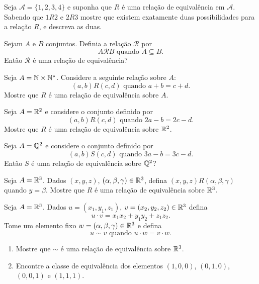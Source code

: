 \documentclass[12pt]{exam}
\begin{document}
    \vspace{.3cm}

    \questao{} Seja $\mathcal{A} = \{1,2,3,4\}$ e suponha que $R$ é uma relação de equivalência em $\mathcal{A}$. Sabendo que $1R2$ e $2R3$ mostre que existem exatamente duas possibilidades para a relação $R$, e descreva as duas.

    \vspace{.3cm}

    \questao{} Sejam $A$ e $B$ conjuntos. Definia a relação $\mathcal{R}$ por
    \[
        A \mathcal{R} B \mbox{ quando } A \subseteq B.
    \]
    Então $\mathcal{R}$ é uma relação de equivalência?

    \vspace{.3cm}

    \questao{} Seja $A = \mathbb{N} \times \mathbb{N}^*$. Considere a seguinte
    relação sobre $A$:
    \[
        (a,b) R (c,d) \mbox{ quando } a + b = c + d.
    \]
    Mostre que $R$ é uma relação de equivalência sobre $A$.

    \vspace{.3cm}

    \questao{} Seja $A = \mathbb{R}^2$ e considere o conjunto definido por
    \[
      (a,b)R(c,d) \mbox{ quando } 2a - b = 2c - d.
    \]
    Mostre que $R$ é uma relação de equivalência sobre $\mathbb{R}^2$.

    \vspace{.3cm}

    \questao{} Seja $A = \mathbb{Q}^2$ e considere o conjunto definido por
    \[
      (a,b)S(c,d) \mbox{ quando } 3a - b = 3c - d.
    \]
    Então $S$ é uma relação de equivalência sobre $\mathbb{Q}^2$?

    \vspace{.3cm}

    \questao{} Seja $A = \mathbb{R}^3$. Dados $(x, y, z)$, $(\alpha, \beta, \gamma) \in \mathbb{R}^3$, defina $(x, y, z) R (\alpha, \beta, \gamma)$
    quando $y = \beta$. Mostre que $R$ é uma relação de equivalência sobre $\mathbb{R}^3.$

    \vspace{.3cm}

    \questao{} Seja $A = \mathbb{R}^3$. Dados $u = (x_1, y_1, z_1)$, $v = (x_2, y_2, z_2) \in \mathbb{R}^3$ defina
    \[
        u\cdot v = x_1x_2 + y_1y_2 + z_1z_2.
    \]
    Tome um elemento fixo $w = (\alpha, \beta, \gamma) \in \mathbb{R}^3$ e defina
    \[
        u \sim v \mbox{ quando } u \cdot w = v \cdot w.
    \]

    \begin{enumerate}[label={\alph*})]
        \item Mostre que $\sim$ é uma relação de equivalência sobre $\mathbb{R}^3$.

        \item Encontre a classe de equivalência dos elementos $(1, 0, 0)$, $(0, 1, 0)$, $(0, 0, 1)$ e $(1, 1, 1)$.
    \end{enumerate}
    \vspace{.3cm}
\end{document}
